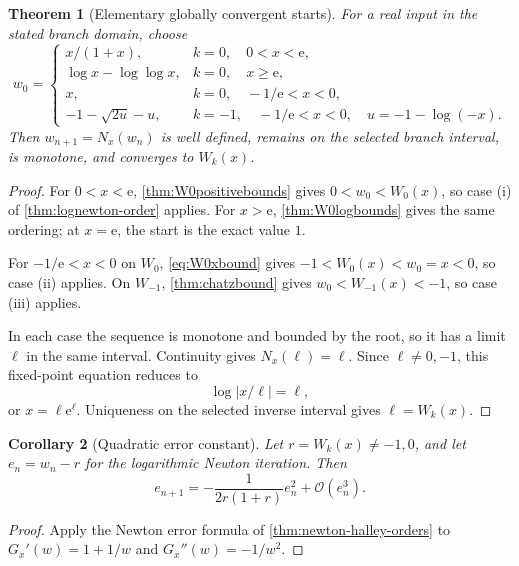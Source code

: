 \documentclass[11pt]{article}
\newtheorem{theorem}{Theorem}[section]
\newtheorem{corollary}[theorem]{Corollary}
\theoremstyle{remark}
\newcommand{\ee}{\mathrm e}
\newcommand{\bigO}{\mathcal O}
\newcommand{\abs}[1]{\left|#1\right|}
\begin{document}
\begin{theorem}[Elementary globally convergent starts]\label{thm:globalstarts}
For a real input in the stated branch domain, choose
\begin{equation}\label{eq:globalstarts}
 w_0=
 \begin{cases}
  x/(1+x),&k=0,\quad 0<x<\ee,\\
  \log x-\log\log x,&k=0,\quad x\geq\ee,\\
  x,&k=0,\quad -1/\ee<x<0,\\
  -1-\sqrt{2u}-u,&k=-1,\quad
       -1/\ee<x<0,\quad u=-1-\log(-x).
 \end{cases}
\end{equation}
Then \(w_{n+1}=N_x(w_n)\) is well defined, remains on the selected branch
interval, is monotone, and converges to \(W_k(x)\).
\end{theorem}

\begin{proof}
For \(0<x<\ee\), \cref{thm:W0positivebounds} gives
\(0<w_0<W_0(x)\), so case (i) of
\cref{thm:lognewton-order} applies.  For \(x>\ee\),
\cref{thm:W0logbounds} gives the same ordering; at \(x=\ee\), the start is
the exact value \(1\).

For \(-1/\ee<x<0\) on \(W_0\), \eqref{eq:W0xbound} gives
\(-1<W_0(x)<w_0=x<0\), so case (ii) applies.  On \(W_{-1}\),
\cref{thm:chatzbound} gives
\(w_0<W_{-1}(x)<-1\), so case (iii) applies.

In each case the sequence is monotone and bounded by the root, so it has a
limit \(\ell\) in the same interval.  Continuity gives
\(N_x(\ell)=\ell\).  Since \(\ell\neq0,-1\), this fixed-point equation
reduces to
\[
       \log\abs{x/\ell}=\ell,
\]
or \(x=\ell\ee^\ell\).  Uniqueness on the selected inverse interval gives
\(\ell=W_k(x)\).
\end{proof}

\begin{corollary}[Quadratic error constant]\label{cor:lognewton-local}
Let \(r=W_k(x)\neq-1,0\), and let \(e_n=w_n-r\) for the logarithmic Newton
iteration.  Then
\begin{equation}\label{eq:lognewton-error}
 e_{n+1}
 =-\frac{1}{2r(1+r)}e_n^2+\bigO(e_n^3).
\end{equation}
\end{corollary}

\begin{proof}
Apply the Newton error formula of
\cref{thm:newton-halley-orders} to
\(G_x'(w)=1+1/w\) and \(G_x''(w)=-1/w^2\).
\end{proof}
\end{document}

